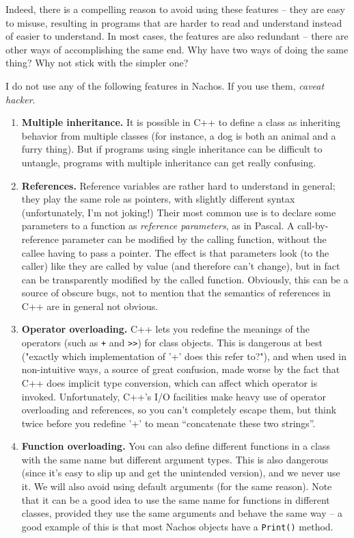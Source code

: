Indeed, there is a compelling reason to avoid using these features -- they are 
easy to misuse, resulting in programs that are harder to read and understand
instead of easier to understand.  In most cases, the features are also 
redundant -- there are other ways of accomplishing the same end.  Why have
two ways of doing the same thing?  Why not stick with the simpler one?

I do not use any of the following features in Nachos.  
If you use them, {\it caveat hacker}.

\begin{enumerate}

\item {\bf Multiple inheritance.}  It is possible in C++ to define
a class as inheriting behavior from multiple classes (for instance,
a dog is both an animal and a furry thing).  But if programs
using single inheritance can be difficult to untangle, programs
with multiple inheritance can get really confusing.

\item {\bf References.}  Reference variables are rather hard to
understand in general; they play the same role as pointers, with
slightly different syntax (unfortunately, I'm not joking!) 
Their most common use is to declare some parameters to a function 
as {\it reference parameters}, as in Pascal.  A call-by-reference 
parameter can be modified by the calling function, without the callee 
having to pass a pointer.  The effect is that parameters look 
(to the caller) like they are called by value (and therefore can't change), 
but in fact can be transparently modified by the called function.
Obviously, this can be a source of obscure bugs, not to mention
that the semantics of references in C++ are in general not obvious.

\item {\bf Operator overloading.}  C++ lets you redefine the meanings
of the operators (such as {\tt +} and \verb+>>+) for class objects.
This is dangerous at best ("exactly which implementation of '+' does
this refer to?"), and when used in non-intuitive ways, a
source of great confusion, made worse by the fact that C++ does 
implicit type conversion, which can affect which operator
is invoked.  Unfortunately, C++'s I/O facilities
make heavy use of operator overloading and references, so you
can't completely escape them, but think twice before you redefine
'+' to mean ``concatenate these two strings''.

\item {\bf Function overloading.}  You can also define different functions
in a class with the same name but different argument types.  This is also
dangerous (since it's easy to slip up and get the unintended version), 
and we never use it.  We will also avoid using default arguments (for the
same reason).  Note that it can be a good idea to use the same name for 
functions in different classes, provided they use the same
arguments and behave the same way -- a good example of this is that 
most Nachos objects have a {\tt Print()} method.


\end{enumerate}
